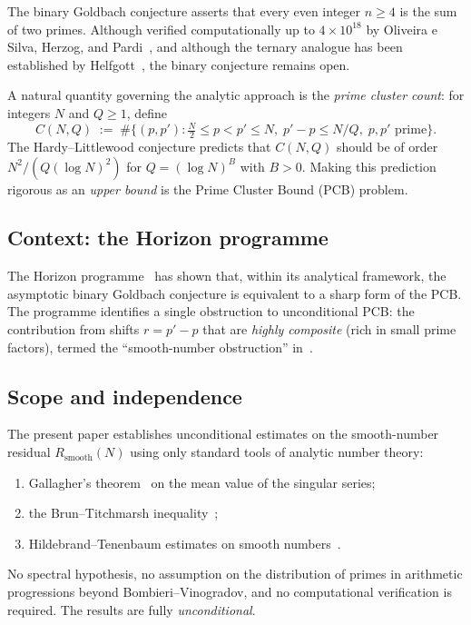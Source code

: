 \documentclass[11pt,reqno]{amsart}
\theoremstyle{plain}
\theoremstyle{definition}
\theoremstyle{remark}
\newcommand{\Rsmooth}{R_{\mathrm{smooth}}}
\begin{document}
The binary Goldbach conjecture asserts that every even integer $n \ge 4$
is the sum of two primes. Although verified computationally up to
$4 \times 10^{18}$ by Oliveira e Silva, Herzog, and Pardi~\cite{OeS2014},
and although the ternary analogue has been established by
Helfgott~\cite{Helfgott2013}, the binary conjecture remains open.

A natural quantity governing the analytic approach is the
\emph{prime cluster count}: for integers $N$ and $Q \ge 1$, define
\begin{equation}\label{eq:CNQ}
  C(N,Q) \;:=\;
  \#\bigl\{(p,p') : \tfrac{N}{2} \le p < p' \le N,\;
  p'-p \le N/Q,\; p,p' \text{ prime}\bigr\}.
\end{equation}
The Hardy--Littlewood conjecture predicts that
$C(N,Q)$ should be of order $N^2/(Q(\log N)^2)$ for
$Q = (\log N)^B$ with $B > 0$. Making this prediction rigorous
as an \emph{upper bound} is the Prime Cluster Bound (PCB) problem.

\subsection{Context: the Horizon programme}

The Horizon programme~\cite{G36,G37} has shown that, within its
analytical framework, the asymptotic binary Goldbach conjecture is
equivalent to a sharp form of the PCB. The programme identifies a single
obstruction to unconditional PCB: the contribution from shifts
$r = p'-p$ that are \emph{highly composite} (rich in small prime factors),
termed the ``smooth-number obstruction'' in~\cite{G37}.

\subsection{Scope and independence}

The present paper establishes unconditional estimates on the
smooth-number residual $\Rsmooth(N)$ using only standard tools
of analytic number theory:
\begin{enumerate}[label=(\roman*),nosep]
  \item Gallagher's theorem~\cite{Gallagher1976} on the mean value
    of the singular series;
  \item the Brun--Titchmarsh inequality~\cite{MV2007};
  \item Hildebrand--Tenenbaum estimates on smooth
    numbers~\cite{HT1986,Tenenbaum2015}.
\end{enumerate}
No spectral hypothesis, no assumption on the distribution of primes
in arithmetic progressions beyond Bombieri--Vinogradov, and no
computational verification is required. The results are fully
\emph{unconditional}.
\end{document}
